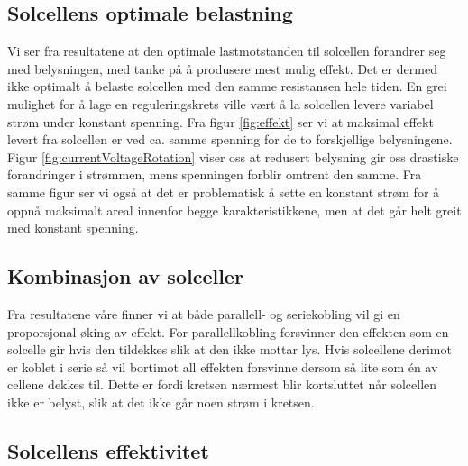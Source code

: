 \documentclass[a4paper,11pt, twocolumn]{article}
\begin{document}
\subsection{Solcellens optimale belastning}
Vi ser fra resultatene at den optimale lastmotstanden til solcellen forandrer seg med belysningen, med tanke på å produsere mest mulig effekt. Det er dermed ikke optimalt å belaste solcellen med den samme resistansen hele tiden. En grei mulighet for å lage en reguleringskrets ville vært å la solcellen levere variabel strøm under konstant spenning. Fra figur \ref{fig:effekt} ser vi at maksimal effekt levert fra solcellen er ved ca. samme spenning for de to forskjellige belysningene. Figur \ref{fig:currentVoltageRotation} viser oss at redusert belysning gir oss drastiske forandringer i strømmen, mens spenningen forblir omtrent den samme. Fra samme figur ser vi også at det er problematisk å sette en konstant strøm for å oppnå maksimalt areal innenfor begge karakteristikkene, men at det går helt greit med konstant spenning.

\subsection{Kombinasjon av solceller}
Fra resultatene våre finner vi at både parallell- og seriekobling vil gi en proporsjonal øking av effekt. For parallellkobling forsvinner den effekten som en solcelle gir hvis den tildekkes slik at den ikke mottar lys. Hvis solcellene derimot er koblet i serie så vil bortimot all effekten forsvinne dersom så lite som \'en av cellene dekkes til. Dette er fordi kretsen nærmest blir kortsluttet når solcellen ikke er belyst, slik at det ikke går noen strøm i kretsen.

\subsection{Solcellens effektivitet} 

\clearpage
\onecolumn
\appendix


\end{document}
